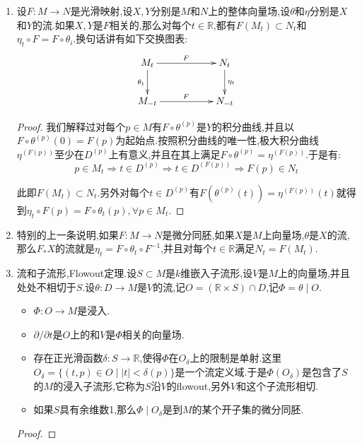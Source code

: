 \begin{enumerate}
\begin{proof}
		现在验证命题中的三件事.第一件事我们已经解释过了,并且据此说明$\theta$本身是一个极大流,否则如果它还能延拓,构成它的某个积分曲线就应该能继续延拓,但是这些积分曲线本身已经都是极大的了.第二件事,按照积分曲线$\theta^{(q)}$的极大性,按照$\gamma(t)=\theta^{(p)}(t+s):D^{(p)}-s\to M$和它在公共定义域上相同,得到$D^{(p)}-s\subset D^{(q)}$.从$0\in D^{(p)}$得到$-s\in D^{(q)}$.群法则得到$\theta^{(q)}(-s)=p$.类似得到$D^{(q)}\subset D^{(p)}-s$.这证明了第二件事.最后证明第三件事:从$D$是开集得到每个$M_t$是开集.第二件事说明,任取$p\in M_t$,那么$t\in D^{(p)}$,于是$D^{\theta_t(p)}=D^{(p)}-t$,于是$-t\in D^{\theta_t(p)}$,于是$\theta_t(p)\in M_{-t}$.这说明$\theta_t$把$M_t$映入$M_{-t}$.群法则保证$\theta_{-t}\circ\theta_t$和$\theta_t\circ\theta_{-t}$分别是$M_t$和$M_{-t}$上的恒等映射,这说明该映射是微分同胚.
	\end{proof}
	\item 设$F:M\to N$是光滑映射,设$X,Y$分别是$M$和$N$上的整体向量场,设$\theta$和$\eta$分别是$X$和$Y$的流.如果$X,Y$是$F$相关的,那么对每个$t\in\mathbb{R}$,都有$F(M_t)\subset N_t$和$\eta_t\circ F=F\circ\theta_i$.换句话讲有如下交换图表:
	$$\xymatrix{M_t\ar[rr]^F\ar[d]_{\theta_t}&&N_t\ar[d]^{\eta_t}\\M_{-t}\ar[rr]^F&&N_{-t}}$$
	\begin{proof}
		
		我们解释过对每个$p\in M$有$F\circ\theta^{(p)}$是$Y$的积分曲线,并且以$F\circ\theta^{(p)}(0)=F(p)$为起始点.按照积分曲线的唯一性,极大积分曲线$\eta^{(F(p))}$至少在$D^{(p)}$上有意义,并且在其上满足$F\circ\theta^{(p)}=\eta^{(F(p))}$.于是有:
		$$p\in M_t\Rightarrow t\in D^{(p)}\Rightarrow t\in D^{(F(p))}\Rightarrow F(p)\in N_t$$
		
		此即$F(M_t)\subset N_t$.另外对每个$t\in D^{(p)}$有$F(\theta^{(p)}(t))=\eta^{(F(p))}(t)$就得到$\eta_t\circ F(p)=F\circ\theta_t(p),\forall p\in M_t$.
	\end{proof}
	\item 特别的上一条说明,如果$F:M\to N$是微分同胚,如果$X$是$M$上向量场,$\theta$是$X$的流,那么$F_*X$的流就是$\eta_t=F\circ\theta_t\circ F^{-1}$,并且对每个$t\in\mathbb{R}$满足$N_t=F(M_t)$.
	\item 流和子流形,Flowout定理.设$S\subset M$是$k$维嵌入子流形,设$V$是$M$上的向量场,并且处处不相切于$S$.设$\theta:D\to M$是$V$的流,记$O=(\mathbb{R}\times S)\cap D$,记$\Phi=\theta\mid O$.
	\begin{itemize}
		\item $\Phi:O\to M$是浸入.
		\item $\partial/\partial t$是$O$上的和$V$是$\Phi$相关的向量场.
		\item 存在正光滑函数$\delta:S\to\mathbb{R}$,使得$\Phi$在$O_{\delta}$上的限制是单射.这里$O_{\delta}=\{(t,p)\in O\mid|t|<\delta(p)\}$是一个流定义域.于是$\Phi(O_{\delta})$是包含了$S$的$M$的浸入子流形,它称为$S$沿$V$的flowout,另外$V$和这个子流形相切.
		\item 如果$S$具有余维数1,那么$\Phi\mid O_{\delta}$是到$M$的某个开子集的微分同胚.
	\end{itemize}
    \begin{proof}
    	

\end{proof}
\end{enumerate}
